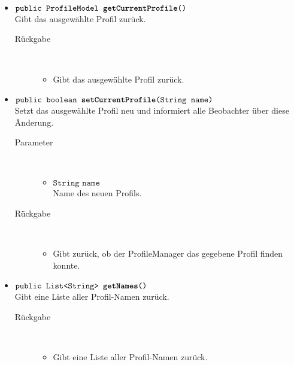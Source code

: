 \begin{description}
\begin{itemize}
		\item $\texttt{public ProfileModel \textbf{getCurrentProfile}()}$ \\ Gibt das ausgewählte Profil zurück.
		\begin{description}
			\item[Rückgabe] \hfill \\
			\vspace{-.8cm}
			\begin{itemize}
				\item Gibt das ausgewählte Profil zurück.
			\end{itemize}
		\end{description}
		
		\item $\texttt{public boolean \textbf{setCurrentProfile}(String name)}$ \\ Setzt das ausgewählte Profil neu und informiert alle Beobachter über diese Änderung.
		\begin{description}
			\item[Parameter] \hfill \\
			\vspace{-.8cm}
			\begin{itemize}
				\item $\texttt{String name}$ \\ Name des neuen Profils.
			\end{itemize}
			\item[Rückgabe] \hfill \\
			\vspace{-.8cm}
			\begin{itemize}
				\item Gibt zurück, ob der ProfileManager das gegebene Profil finden konnte.
			\end{itemize}
		\end{description}
		
		\item $\texttt{public List<String> \textbf{getNames}()}$ \\ Gibt eine Liste aller Profil-Namen zurück.
		\begin{description}
			\item[Rückgabe] \hfill \\
			\vspace{-.8cm}
			\begin{itemize}
				\item Gibt eine Liste aller Profil-Namen zurück.	
			\end{itemize}
		\end{description}
		

\end{itemize}
\end{description}
